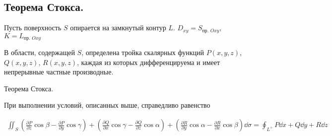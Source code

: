 \subsection{%
  Теорема Стокса.%
}

\begin{twocolumns}
  
  \columnbreak

  Пусть поверхность \(S\) опирается на замкнутый контур \(L\).
  \(D_{xy} = S_{\text{пр. } Oxy}\), \(K = L_{\text{пр. } Oxy}\)
  
  В области, содержащей \(S\), определена тройка скалярных функций
  \(P(x, y, z)\), \(Q(x, y, z)\), \(R(x, y, z)\), каждая из которых
  дифференцируема и имеет непрерывные частные производные.
\end{twocolumns}
  
\begin{theorem}\label{ST}
  Теорема Стокса.

  При выполнении условий, описанных выше, справедливо равенство
  
  \begin{align*}
    \iint_{S}
      \left(
        \frac{\partial P}{\partial z} \cos \beta
        - \frac{\partial P}{\partial y} \cos \gamma
      \right)
      + \left(
        \frac{\partial Q}{\partial x} \cos \gamma
        - \frac{\partial Q}{\partial z} \cos \alpha
      \right)
      + \left(
        \frac{\partial R}{\partial y} \cos \alpha
        - \frac{\partial R}{\partial x} \cos \beta
      \right) \dd \sigma
    = \oint_{L^{+}} P \dd x + Q \dd y + R \dd z
  \end{align*}
\end{theorem}  
